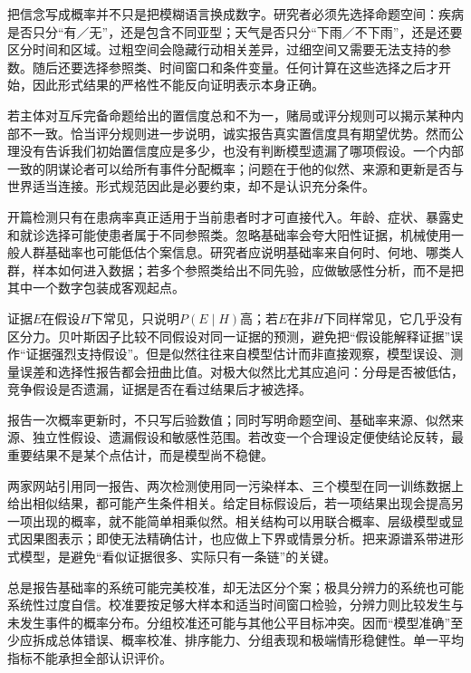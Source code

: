 把信念写成概率并不只是把模糊语言换成数字。研究者必须先选择命题空间：疾病是否只分“有／无”，还是包含不同亚型；天气是否只分“下雨／不下雨”，还是还要区分时间和区域。过粗空间会隐藏行动相关差异，过细空间又需要无法支持的参数。随后还要选择参照类、时间窗口和条件变量。任何计算在这些选择之后才开始，因此形式结果的严格性不能反向证明表示本身正确。

若主体对互斥完备命题给出的置信度总和不为一，赌局或评分规则可以揭示某种内部不一致。恰当评分规则进一步说明，诚实报告真实置信度具有期望优势\parencite{joyce1998}。然而公理没有告诉我们初始置信度应是多少，也没有判断模型遗漏了哪项假设。一个内部一致的阴谋论者可以给所有事件分配概率；问题在于他的似然、来源和更新是否与世界适当连接。形式规范因此是必要约束，却不是认识充分条件。

开篇检测只有在患病率真正适用于当前患者时才可直接代入。年龄、症状、暴露史和就诊选择可能使患者属于不同参照类。忽略基础率会夸大阳性证据，机械使用一般人群基础率也可能低估个案信息。研究者应说明基础率来自何时、何地、哪类人群，样本如何进入数据；若多个参照类给出不同先验，应做敏感性分析，而不是把其中一个数字包装成客观起点。

证据$E$在假设$H$下常见，只说明$P(E\mid H)$高；若$E$在非$H$下同样常见，它几乎没有区分力。贝叶斯因子比较不同假设对同一证据的预测，避免把“假设能解释证据”误作“证据强烈支持假设”。但是似然往往来自模型估计而非直接观察，模型误设、测量误差和选择性报告都会扭曲比值。对极大似然比尤其应追问：分母是否被低估，竞争假设是否遗漏，证据是否在看过结果后才被选择。

\begin{argumentbox}
报告一次概率更新时，不只写后验数值；同时写明命题空间、基础率来源、似然来源、独立性假设、遗漏假设和敏感性范围。若改变一个合理设定便使结论反转，最重要结果不是某个点估计，而是模型尚不稳健。
\end{argumentbox}

两家网站引用同一报告、两次检测使用同一污染样本、三个模型在同一训练数据上给出相似结果，都可能产生条件相关。给定目标假设后，若一项结果出现会提高另一项出现的概率，就不能简单相乘似然。相关结构可以用联合概率、层级模型或显式因果图表示；即使无法精确估计，也应做上下界或情景分析。把来源谱系带进形式模型，是避免“看似证据很多、实际只有一条链”的关键。

总是报告基础率的系统可能完美校准，却无法区分个案；极具分辨力的系统也可能系统性过度自信。校准要按足够大样本和适当时间窗口检验，分辨力则比较发生与未发生事件的概率分布。分组校准还可能与其他公平目标冲突。因而“模型准确”至少应拆成总体错误、概率校准、排序能力、分组表现和极端情形稳健性。单一平均指标不能承担全部认识评价。

